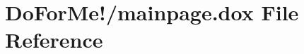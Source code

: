 \hypertarget{mainpage_8dox}{\section{Do\-For\-Me!/mainpage.dox File Reference}
\label{mainpage_8dox}
}
